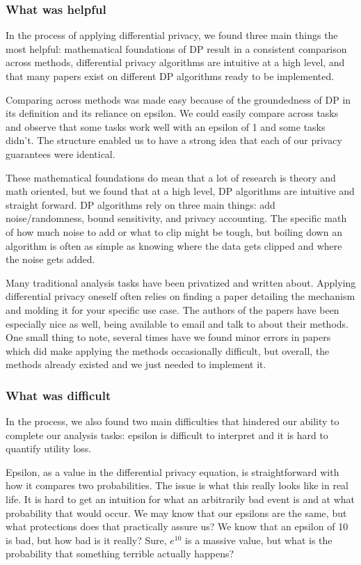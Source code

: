 \documentclass[12pt,letterpaper]{article}
\begin{document}
{\subsubsection{What was helpful}
In the process of applying differential privacy, we found three main things the most helpful: mathematical foundations of DP result in a consistent comparison across methods, differential privacy algorithms are intuitive at a high level, and that many papers exist on different DP algorithms ready to be implemented.

Comparing across methods was made easy because of the groundedness of DP in its definition and its reliance on epsilon. We could easily compare across tasks and observe that some tasks work well with an epsilon of 1 and some tasks didn't. The structure enabled us to have a strong idea that each of our privacy guarantees were identical.

These mathematical foundations do mean that a lot of research is theory and math oriented, but we found that at a high level, DP algorithms are intuitive and straight forward. DP algorithms rely on three main things: add noise/randomness, bound sensitivity, and privacy accounting. The specific math of how much noise to add or what to clip might be tough, but boiling down an algorithm is often as simple as knowing where the data gets clipped and where the noise gets added.

Many traditional analysis tasks have been privatized and written about. Applying differential privacy oneself often relies on finding a paper detailing the mechanism and molding it for your specific use case. The authors of the papers have been especially nice as well, being available to email and talk to about their methods. One small thing to note, several times have we found minor errors in papers which did make applying the methods occasionally difficult, but overall, the methods already existed and we just needed to implement it.  

\subsubsection{What was difficult}
In the process, we also found two main difficulties that hindered our ability to complete our analysis tasks: epsilon is difficult to interpret and it is hard to quantify utility loss.

Epsilon, as a value in the differential privacy equation, is straightforward with how it compares two probabilities. The issue is what this really looks like in real life. It is hard to get an intuition for what an arbitrarily bad event is and at what probability that would occur. We may know that our epsilons are the same, but what protections does that practically assure us? We know that an epsilon of 10 is bad, but how bad is it really? Sure, $e^{10}$ is a massive value, but what is the probability that something terrible actually happens?

}
\end{document}
